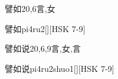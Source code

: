\begin{Entry}{譬如}{20,6}{⾔,⼥}
  \begin{Phonetics}{譬如}{pi4ru2}[][HSK 7-9]
  \end{Phonetics}
\end{Entry}

\begin{Entry}{譬如说}{20,6,9}{⾔,⼥,⾔}
  \begin{Phonetics}{譬如说}{pi4ru2shuo1}[][HSK 7-9]
  \end{Phonetics}
\end{Entry}


